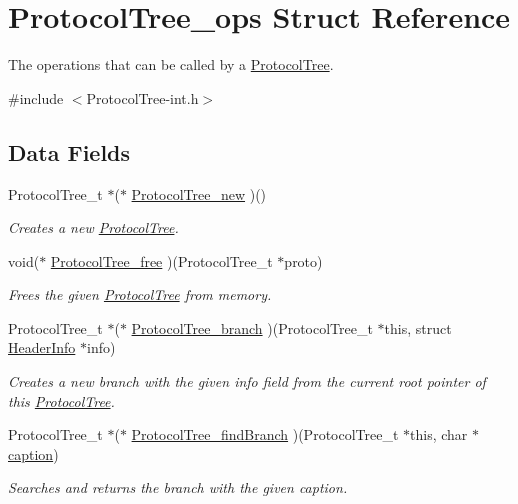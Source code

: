 \hypertarget{struct_protocol_tree__ops}{}\section{Protocol\+Tree\+\_\+ops Struct Reference}
\label{struct_protocol_tree__ops}


The operations that can be called by a \hyperlink{struct_protocol_tree}{Protocol\+Tree}.  




{\ttfamily \#include $<$Protocol\+Tree-\/int.\+h$>$}

\subsection*{Data Fields}
\begin{DoxyCompactItemize}
\item 
Protocol\+Tree\+\_\+t $\ast$($\ast$ \hyperlink{struct_protocol_tree__ops_aba9d5a98ad9e37f9f813d7e09a77e7f3}{Protocol\+Tree\+\_\+new} )()
\begin{DoxyCompactList}\small\item\em Creates a new \hyperlink{struct_protocol_tree}{Protocol\+Tree}. \end{DoxyCompactList}\item 
void($\ast$ \hyperlink{struct_protocol_tree__ops_a23049a430e1176244701e816713b0795}{Protocol\+Tree\+\_\+free} )(Protocol\+Tree\+\_\+t $\ast$proto)
\begin{DoxyCompactList}\small\item\em Frees the given \hyperlink{struct_protocol_tree}{Protocol\+Tree} from memory. \end{DoxyCompactList}\item 
Protocol\+Tree\+\_\+t $\ast$($\ast$ \hyperlink{struct_protocol_tree__ops_a06a5e56e65a501e6b0fb212f9c2203d5}{Protocol\+Tree\+\_\+branch} )(Protocol\+Tree\+\_\+t $\ast$this, struct \hyperlink{struct_header_info}{Header\+Info} $\ast$info)
\begin{DoxyCompactList}\small\item\em Creates a new branch with the given info field from the current root pointer of this \hyperlink{struct_protocol_tree}{Protocol\+Tree}. \end{DoxyCompactList}\item 
Protocol\+Tree\+\_\+t $\ast$($\ast$ \hyperlink{struct_protocol_tree__ops_ac182caeb095b0f9d5fe44363672e55b1}{Protocol\+Tree\+\_\+find\+Branch} )(Protocol\+Tree\+\_\+t $\ast$this, char $\ast$\hyperlink{_protocol_tree_8h_a63ae034482d14155f153ac2f8d4e4971}{caption})
\begin{DoxyCompactList}\small\item\em Searches and returns the branch with the given caption. \end{DoxyCompactList}\end{DoxyCompactItemize}



